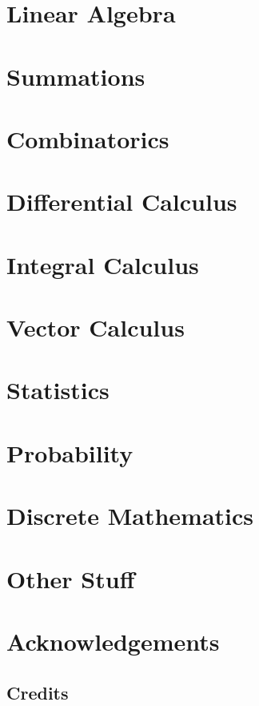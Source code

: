 \documentclass[11pt]{book}
\begin{document}


\chapter{Linear Algebra}



\chapter{Summations}



\chapter{Combinatorics}



\chapter{Differential Calculus}



\chapter{Integral Calculus}



\chapter{Vector Calculus}



\chapter{Statistics}

\chapter{Probability}



\chapter{Discrete Mathematics}



\chapter{Other Stuff}



\chapter*{Acknowledgements}

\section*{Credits}
\end{document}

